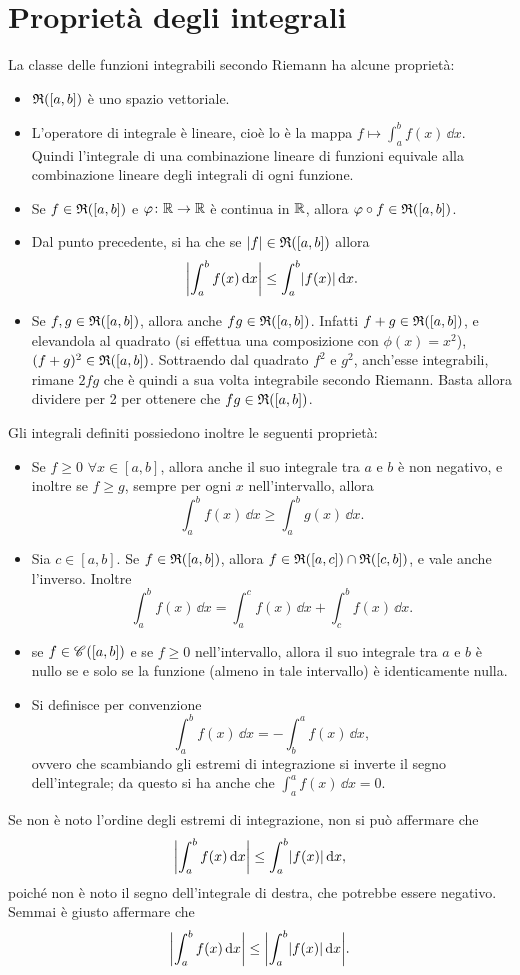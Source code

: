 \section{Proprietà degli integrali}
La classe delle funzioni integrabili secondo Riemann ha alcune proprietà:
\begin{itemize}
\item $\rie{[a,b]}$ è uno spazio vettoriale.
\item L'operatore di integrale è lineare, cioè lo è la mappa $f\mapsto\int_a^bf(x)\,\dd x$. Quindi l'integrale di una combinazione lineare di funzioni equivale alla combinazione lineare degli integrali di ogni funzione.
\item Se $f\in\rie{[a,b]}$ e $\phi\colon\R\to\R$ è continua in $\R$, allora $\phi\circ f\in\rie{[a,b]}$.
\item Dal punto precedente, si ha che se $\abs{f}\in\rie{[a,b]}$ allora
\[
	\abs[\bigg]{\int_a^bf(x)\,\dd x}\leq\int_a^b\abs{f(x)}\,\dd x.
\]
\item Se $f,g\in\rie{[a,b]}$, allora anche $fg\in\rie{[a,b]}$. Infatti $f+g\in\rie{[a,b]}$, e elevandola al quadrato (si effettua una composizione con $\phi(x)=x^2$), $(f+g)^2\in\rie{[a,b]}$. Sottraendo dal quadrato $f^2$ e $g^2$, anch'esse integrabili, rimane $2fg$ che è quindi a sua volta integrabile secondo Riemann. Basta allora dividere per 2 per ottenere che $fg\in\rie{[a,b]}$.
\end{itemize}
Gli integrali definiti possiedono inoltre le seguenti proprietà:
\begin{itemize}
	\item Se $f\geq0$ $\forall x\in[a,b]$, allora anche il suo integrale tra $a$ e $b$ è non negativo, e inoltre se $f\geq g$, sempre per ogni $x$ nell'intervallo, allora
\[
\int_a^bf(x)\,\dd x\geq\int_a^bg(x)\,\dd x.
\]
\item Sia $c\in[a,b]$. Se $f\in\rie{[a,b]}$, allora $f\in\rie{[a,c]}\cap\rie{[c,b]}$, e vale anche l'inverso. Inoltre
\[
\int_a^bf(x)\,\dd x=\int_a^cf(x)\,\dd x+\int_c^bf(x)\,\dd x.
\]
\item se $f\in\cont{[a,b]}$ e se $f\geq 0$ nell'intervallo, allora il suo integrale tra $a$ e $b$ è nullo se e solo se la funzione (almeno in tale intervallo) è identicamente nulla.
\item Si definisce per convenzione
\[
\int_a^bf(x)\,\dd x=-\int_b^af(x)\,\dd x,
\]
ovvero che scambiando gli estremi di integrazione si inverte il segno dell'integrale; da questo si ha anche che $\int_a^af(x)\,\dd x=0$.
\end{itemize}
Se non è noto l'ordine degli estremi di integrazione, non si può affermare che
\[
	\abs[\bigg]{\int_a^bf(x)\,\dd x}\leq\int_a^b\abs{f(x)}\,\dd x,
\]
poiché non è noto il segno dell'integrale di destra, che potrebbe essere negativo. Semmai è giusto affermare che
\[
	\abs[\bigg]{\int_a^bf(x)\,\dd x}\leq\abs[\bigg]{\int_a^b\abs{f(x)}\,\dd x}.
\]

